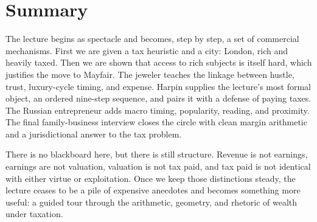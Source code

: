 \section{Summary}

The lecture begins as spectacle and becomes, step by step, a set of commercial mechanisms. First we are given a tax heuristic and a city: London, rich and heavily taxed. Then we are shown that access to rich subjects is itself hard, which justifies the move to Mayfair. The jeweler teaches the linkage between hustle, trust, luxury-cycle timing, and expense. Harpin supplies the lecture's most formal object, an ordered nine-step sequence, and pairs it with a defense of paying taxes. The Russian entrepreneur adds macro timing, popularity, reading, and proximity. The final family-business interview closes the circle with clean margin arithmetic and a jurisdictional answer to the tax problem.

There is no blackboard here, but there is still structure. Revenue is not earnings, earnings are not valuation, valuation is not tax paid, and tax paid is not identical with either virtue or exploitation. Once we keep those distinctions steady, the lecture ceases to be a pile of expensive anecdotes and becomes something more useful: a guided tour through the arithmetic, geometry, and rhetoric of wealth under taxation.